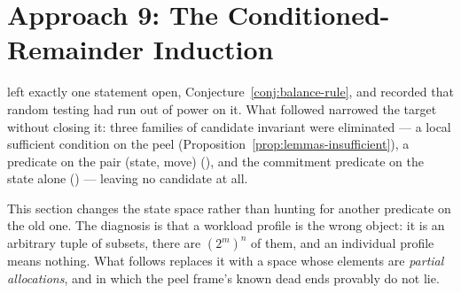 \section{Approach 9: The Conditioned-Remainder Induction}
\label{sec:approach9}

 left exactly one statement open,
Conjecture~\ref{conj:balance-rule}, and  recorded
that random testing had run out of power on it. What followed narrowed the
target without closing it: three families of candidate invariant were
eliminated --- a local sufficient condition on the peel
(Proposition~\ref{prop:lemmas-insufficient}), a predicate on the pair
(state, move) (), and the commitment predicate
on the state alone () --- leaving no candidate at
all.

This section changes the state space rather than hunting for another predicate
on the old one. The diagnosis is that a workload profile is the wrong object: it
is an arbitrary tuple of subsets, there are $(2^m)^n$ of them, and an individual
profile means nothing. What follows replaces it with a space whose elements are
\emph{partial allocations}, and in which the peel frame's known dead ends
provably do not lie.

